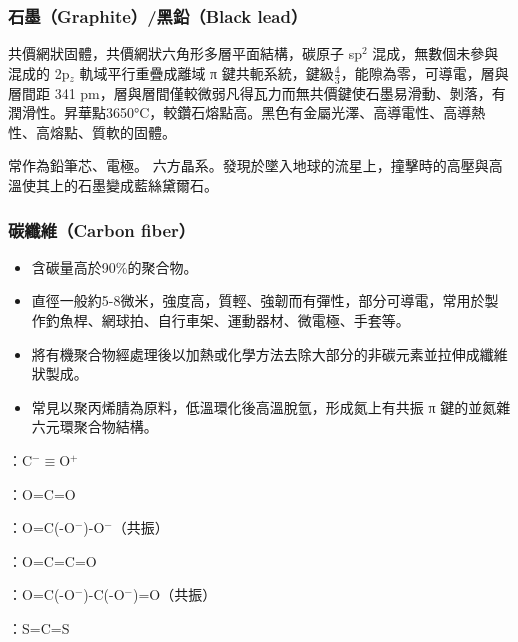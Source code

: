 \documentclass[a4paper,12pt]{report}
\begin{document}
\subsubsection{石墨（Graphite）/黑鉛（Black lead）}
\bit
\item 共價網狀固體，共價網狀六角形多層平面結構，碳原子 sp$^2$ 混成，無數個未參與混成的 2p$_z$ 軌域平行重疊成離域 π 鍵共軛系統，鍵級$\frac{4}{3}$，能隙為零，可導電，層與層間距 341 pm，層與層間僅較微弱凡得瓦力而無共價鍵使石墨易滑動、剝落，有潤滑性。昇華點3650°C，較鑽石熔點高。黑色有金屬光澤、高導電性、高導熱性、高熔點、質軟的固體。
\item 常作為鉛筆芯、電極。
\eit
{}
六方晶系。發現於墜入地球的流星上，撞擊時的高壓與高溫使其上的石墨變成藍絲黛爾石。
\subsubsection{碳纖維（Carbon fiber）}
\begin{itemize}
\item 含碳量高於90\%的聚合物。
\item 直徑一般約5-8微米，強度高，質輕、強韌而有彈性，部分可導電，常用於製作釣魚桿、網球拍、自行車架、運動器材、微電極、手套等。
\item 將有機聚合物經處理後以加熱或化學方法去除大部分的非碳元素並拉伸成纖維狀製成。
\item 常見以聚丙烯腈為原料，低溫環化後高溫脫氫，形成氮上有共振 π 鍵的並氮雜六元環聚合物結構。
\end{itemize}
\bit
\item {}：C$^-\equiv$O$^+$
\item {}：O=C=O
\item {}：O=C(-O$^-$)-O$^-$（共振）
\item {}：O=C=C=O
\item {}：O=C(-O$^-$)-C(-O$^-$)=O（共振）
\item {}：S=C=S
\eit
\end{document}

